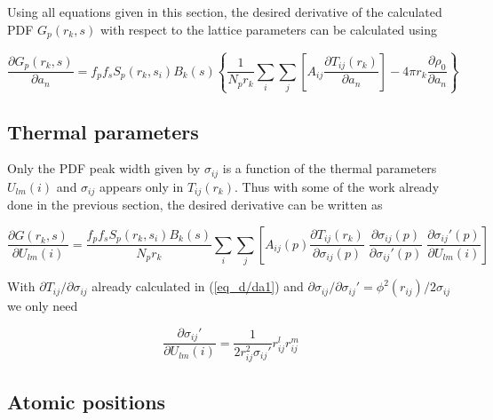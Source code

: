 \noindent
Using all equations given in this section, the desired derivative of the
calculated PDF $G_{p}(r_{k},s)$ with respect to the lattice parameters
can be calculated using

\begin{equation}
  \frac{\partial G_{p}(r_{k},s)} {\partial a_{n}} =
    f_{p}f_{s} S_{p}(r_{k},s_{i}) B_{k}(s) \left \{ \frac{1}{N_{p}r_{k}} \sum_{i} \sum_{j}
    \left [ A_{ij} \frac{\partial T_{ij}(r_{k})}{\partial a_{n}} \right ]
    - 4 \pi r_{k} \frac{\partial \rho_{0}} {\partial a_{n}} \right \}
  \label{eq_d/da6}
\end{equation}


\subsection*{Thermal parameters}

Only the PDF peak width given by  $\sigma_{ij}$ is a function of the
thermal parameters $U_{lm}(i)$ and $\sigma_{ij}$ appears only in $T_{ij}
(r_{k})$. Thus with some of the work already done in the previous
section, the desired derivative can be written as

\begin{equation}
  \frac{\partial G(r_{k},s)} {\partial U_{lm}(i)} =
    \frac{f_{p}f_{s} S_{p}(r_{k},s_{i}) B_{k}(s)}{N_{p}r_{k}} \sum_{i} \sum_{j}
    \left [ A_{ij}(p) \frac{\partial T_{ij}(r_{k})}{\partial \sigma_{ij}(p)}
    \; \frac{\partial \sigma_{ij}(p)}{\partial \sigma_{ij}'(p)}
    \; \frac{\partial \sigma_{ij}'(p)}{\partial U_{lm}(i)} \right ]
  \label{eq_d/du1}
\end{equation}

\noindent With $\partial T_{ij} / \partial \sigma_{ij}$ already
calculated in (\ref{eq_d/da1}) and $\partial \sigma_{ij} /
\partial \sigma_{ij}' = \phi^{2}(r_{ij})/2\sigma_{ij}$ we only need

\begin{equation}
  \frac{\partial \sigma_{ij}'}{\partial U_{lm}(i)} =
    \frac{1}{2 r_{ij}^{2} \sigma_{ij}'} r_{ij}^{l}r_{ij}^{m}
  \label{eq_d/du2}
\end{equation}


\subsection*{Atomic positions}

